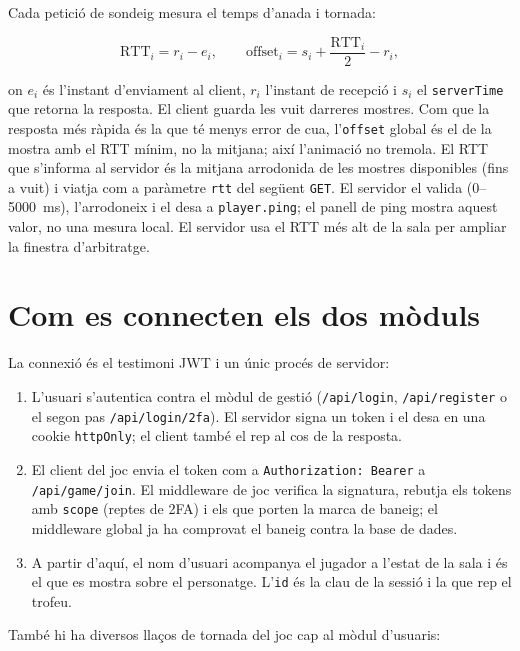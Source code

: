 \documentclass[11pt,a4paper]{article}
\begin{document}
Cada petició de sondeig mesura el temps d'anada i tornada:

\[
  \mathrm{RTT}_i = r_i - e_i,
  \qquad
  \mathrm{offset}_i = s_i + \frac{\mathrm{RTT}_i}{2} - r_i,
\]

on $e_i$ és l'instant d'enviament al client, $r_i$ l'instant de recepció i $s_i$ el
\texttt{serverTime} que retorna la resposta. El client guarda les vuit darreres mostres.
Com que la resposta més ràpida és la que té menys error de cua, l'\texttt{offset} global
és el de la mostra amb el RTT mínim, no la mitjana; així l'animació no tremola. El RTT
que s'informa al servidor és la mitjana arrodonida de les mostres disponibles (fins a
vuit) i viatja com a paràmetre \texttt{rtt} del següent \texttt{GET}. El servidor el
valida (0--5000~ms), l'arrodoneix i el desa a \texttt{player.ping}; el panell de ping
mostra aquest valor, no una mesura local. El servidor usa el RTT més alt de la sala per
ampliar la finestra d'arbitratge.

\section{Com es connecten els dos mòduls}
\label{sec:connexio}

La connexió és el testimoni JWT i un únic procés de servidor:

\begin{enumerate}
  \item L'usuari s'autentica contra el mòdul de gestió (\texttt{/api/login},
        \texttt{/api/register} o el segon pas \texttt{/api/login/2fa}). El servidor
        signa un token i el desa en una cookie \texttt{httpOnly}; el client també el rep
        al cos de la resposta.
  \item El client del joc envia el token com a \texttt{Authorization: Bearer} a
        \texttt{/api/game/join}. El middleware de joc verifica la signatura, rebutja els
        tokens amb \texttt{scope} (reptes de 2FA) i els que porten la marca de baneig;
        el middleware global ja ha comprovat el baneig contra la base de dades.
  \item A partir d'aquí, el nom d'usuari acompanya el jugador a l'estat de la sala i és
        el que es mostra sobre el personatge. L'\texttt{id} és la clau de la sessió i
        la que rep el trofeu.
\end{enumerate}

També hi ha diversos llaços de tornada del joc cap al mòdul d'usuaris:
\end{document}
